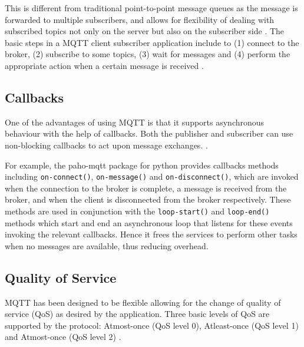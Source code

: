 This is different from traditional point-to-point message queues as
the message is forwarded to multiple subscribers, and allows for
flexibility of dealing with subscribed topics not only on the server
but also on the subscriber side \cite{hivemq-details}. The basic steps
in a MQTT client subscriber application include to (1) connect to the broker,
(2) subscribe to some topics, (3) wait for messages and (4) perform the
appropriate action when a certain message is received
\cite{mqtt-wiki}.
 
\subsection{Callbacks}

One of the advantages of using MQTT is that it supports
asynchronous behaviour with the help of callbacks. Both the publisher
and subscriber can use non-blocking callbacks to act upon message exchanges.
\cite{hivemq-details}\cite{python-paho-mqtt}.

For example, the paho-mqtt package for python provides callbacks
methods including \verb|on-connect()|, \verb|on-message()| and
\verb|on-disconnect()|, which are invoked when the connection to the
broker is complete, a message is received from the broker, and when
the client is disconnected from the broker respectively. These methods
are used in conjunction with the \verb|loop-start()| and \verb|loop-end()| methods
which start and end an asynchronous loop that listens for these events
invoking the relevant callbacks. Hence it frees the services to perform
other tasks \cite{python-paho-mqtt} when no messages are available,
thus reducing overhead.

\subsection{Quality of Service}

MQTT has been designed to be flexible allowing for the change of
quality of service (QoS) as desired by the application. Three basic
levels of QoS are supported by the protocol:  Atmost-once (QoS level
0), Atleast-once (QoS level 1) and Atmost-once (QoS level 2)
\cite{hivemq-qos,python-paho-mqtt}.

